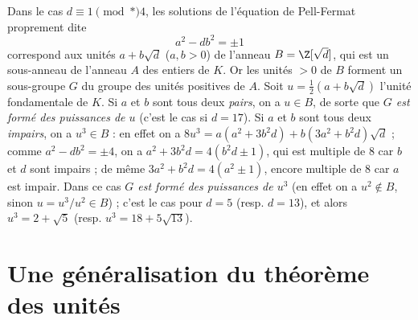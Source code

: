 \documentclass[11pt, %
  title in boldface,
  theorem in new line,
  theorem numbering = section,
  number theorems separately,
  simple name,
]{beaulivre}
\begin{document}
\begin{enumerate}
        \begin{remark}
            Dans le cas \( d \equiv 1 \pmod*{4} \), les solutions de l'équation de Pell-Fermat proprement dite
            \[
                a^2 - db^2 = \pm 1
            \]
            correspond aux unités \( a+b\sqrt{d} \) (\( a,b > 0 \)) de l'anneau \( B = \Z[\sqrt{d}] \), qui est un sous-anneau de l'anneau \( A \) des entiers de \( K \). Or les unités \( > 0 \) de \( B \) forment un sous-groupe \( G \) du groupe des unités positives de \( A \). Soit \( u = \frac{1}{2}(a+b\sqrt{d}) \) l'unité fondamentale de \( K \). Si \( a \) et \( b \) sont tous deux \emph{pairs}, on a \( u \in B \), de sorte que \emph{\( G \) est formé des puissances de \( u \)} (c'est le cas si \( d = 17 \)). Si \( a \) et \( b \) sont tous deux \emph{impairs}, on a \( u^3 \in B \) : en effet on a \( 8u^3 = a(a^2+3b^2 d)+b(3a^2+b^2 d)\sqrt{d} \) ; comme \( a^2-db^2 = \pm 4 \), on a \( a^2+3b^2 d = 4(b^2 d \pm 1) \), qui est multiple de \( 8 \) car \( b \) et \( d \) sont impairs ; de même \( 3a^2+b^2 d = 4(a^2 \pm 1) \), encore multiple de \( 8 \) car \( a \) est impair. Dans ce cas \emph{\( G \) est formé des puissances de \( u^3 \)} (en effet on a \( u^2 \notin B \), sinon \( u = u^3/u^2 \in B \)) ; c'est le cas pour \( d = 5 \) (resp. \( d = 13 \)), et alors \( u^3 = 2+\sqrt{5} \) (resp. \( u^3 = 18+5\sqrt{13} \)).
        \end{remark}
    \end{enumerate}

\section{Une généralisation du théorème des unités}\label{sec:une généralisation du théorème des unités}
\end{document}
